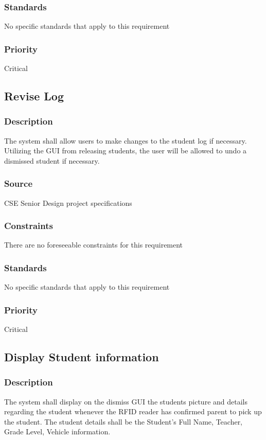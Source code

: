 \subsubsection{Standards}
No specific standards that apply to this requirement
\subsubsection{Priority}
Critical



\subsection{Revise Log}
\subsubsection{Description}
The system shall allow users to make changes to the student log if necessary. 
Utilizing the GUI from releasing students, the user will be allowed to undo a 
dismissed student if necessary.
\subsubsection{Source}
CSE Senior Design project specifications
\subsubsection{Constraints}
There are no foreseeable constraints for this requirement  
\subsubsection{Standards}
No specific standards that apply to this requirement
\subsubsection{Priority}
Critical



\subsection{Display Student information}
\subsubsection{Description}
The system shall display on the dismiss GUI the students picture and details 
regarding the student whenever the RFID reader has confirmed parent to pick up the 
student. The student details shall be the Student’s Full Name, Teacher, Grade Level, 
Vehicle information.
